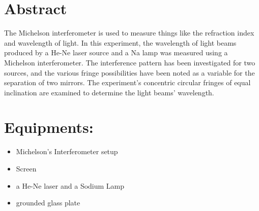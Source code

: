 \section{Abstract} 
	The Michelson interferometer is used to measure things like the refraction index and wavelength of light. In this experiment, the wavelength of light beams produced by a He-Ne laser source and a Na lamp was measured using a Michelson interferometer. The interference pattern has been investigated for two sources, and the various fringe possibilities have been noted as a variable for the separation of two mirrors. The experiment's concentric circular fringes of equal inclination are examined to determine the light beams' wavelength.

\section{Equipments:}
	\begin{itemize}
		\item Michelson's Interferometer setup
		\item Screen
		\item a He-Ne laser and a Sodium Lamp
		\item grounded glass plate
	\end{itemize}